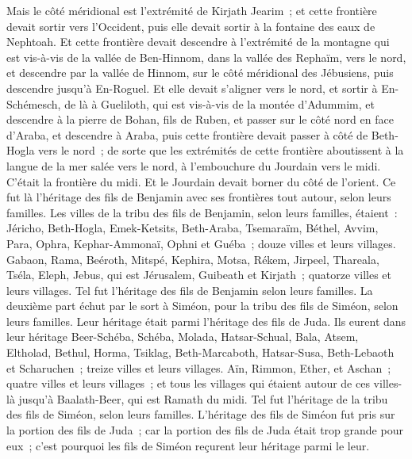 \begin{multicols}{2}
Mais le côté méridional est l'extrémité de Kirjath Jearim~; et cette frontière devait sortir vers l'Occident, puis elle devait sortir à la fontaine des eaux de Nephtoah. 
Et cette frontière devait descendre à l'extrémité de la montagne qui est vis-à-vis de la vallée de Ben-Hinnom, dans la vallée des Rephaïm, vers le nord, et descendre par la vallée de Hinnom, sur le côté méridional des Jébusiens, puis descendre jusqu'à En-Roguel.
Et elle devait s'aligner vers le nord, et sortir à En-Schémesch, de là à Gueliloth, qui est vis-à-vis de la montée d'Adummim, et descendre à la pierre de Bohan, fils de Ruben,
et passer sur le côté nord en face d'Araba, et descendre à Araba,
puis cette frontière devait passer à côté de Beth-Hogla vers le nord~; de sorte que les extrémités de cette frontière aboutissent à la langue de la mer salée vers le nord, à l'embouchure du Jourdain vers le midi. C'était la frontière du midi.
Et le Jourdain devait borner du côté de l'orient. Ce fut là l'héritage des fils de Benjamin avec ses frontières tout autour, selon leurs familles.
Les villes de la tribu des fils de Benjamin, selon leurs familles, étaient~: Jéricho, Beth-Hogla, Emek-Ketsits,
Beth-Araba, Tsemaraïm, Béthel,
Avvim, Para, Ophra,
Kephar-Ammonaï, Ophni et Guéba~; douze villes et leurs villages.
Gabaon, Rama, Beéroth,
Mitspé, Kephira, Motsa,
Rékem, Jirpeel, Thareala,
Tséla, Eleph, Jebus, qui est Jérusalem, Guibeath et Kirjath~; quatorze villes et leurs villages. Tel fut l'héritage des fils de Benjamin selon leurs familles.
\VerseOne{}La deuxième part échut par le sort à Siméon, pour la tribu des fils de Siméon, selon leurs familles. Leur héritage était parmi l'héritage des fils de Juda.
Ils eurent dans leur héritage Beer-Schéba, Schéba, Molada,
Hatsar-Schual, Bala, Atsem,
Eltholad, Bethul, Horma,
Tsiklag, Beth-Marcaboth, Hatsar-Susa,
Beth-Lebaoth et Scharuchen~; treize villes et leurs villages.
Aïn, Rimmon, Ether, et Aschan~; quatre villes et leurs villages~;
et tous les villages qui étaient autour de ces villes-là jusqu'à Baalath-Beer, qui est Ramath du midi. Tel fut l'héritage de la tribu des fils de Siméon, selon leurs familles.
L'héritage des fils de Siméon fut pris sur la portion des fils de Juda~; car la portion des fils de Juda était trop grande pour eux~; c'est pourquoi les fils de Siméon reçurent leur héritage parmi le leur.

\end{multicols}
